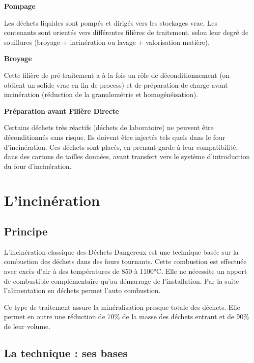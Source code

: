 \textbf{Pompage}
\vspace{0.3 cm}

Les déchets liquides sont pompés et dirigés vers les stockages vrac.
Les contenants sont orientés vers différentes filières de traitement, selon leur degré de souillures (broyage + incinération ou lavage + valorisation matière).

\vspace{0.3 cm}
\textbf{Broyage}
\vspace{0.3 cm}

Cette filière de pré-traitement a à la fois un rôle de déconditionnement (on obtient un solide vrac en fin de process) et de préparation de charge avant incinération (réduction de la granulométrie et homogénéisation).

\vspace{0.3 cm}
\textbf{Préparation avant Filière Directe}
\vspace{0.3 cm}

Certains déchets très réactifs (déchets de laboratoire) ne peuvent être déconditionnés sans risque. Ils doivent être injectés tels quels dans le four d’incinération.
Ces déchets sont placés, en prenant garde à leur compatibilité, dans des cartons de tailles données, avant transfert vers le système d’introduction du four d’incinération.

 
\section{L'incinération}
\subsection{Principe} 

L’incinération classique des Déchets Dangereux est une technique basée sur la combustion des déchets dans des fours tournants. Cette combustion est effectuée avec excès d’air à des températures de 850 à 1100°C.
Elle ne nécessite un apport de combustible complémentaire qu’au démarrage de l’installation. Par la suite l’alimentation en déchets permet l’auto combustion.
\vspace{0.3 cm}

Ce type de traitement assure la minéralisation presque totale des déchets. Elle permet en outre une réduction de 70\% de la masse des déchets entrant et de 90\% de leur volume.

\subsection{La technique : ses bases}

